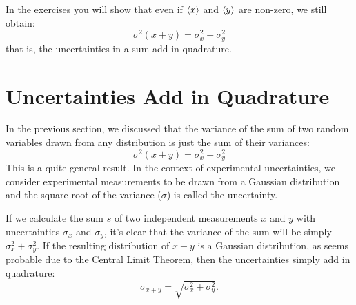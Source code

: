 \documentclass[12pt,oneside]{book}
\begin{document}
In the exercises you will show that even if $\braket{x}$ and $\braket{y}$ are non-zero, we still obtain:
\begin{displaymath}
\sigma^2(x+y) = \sigma^2_x + \sigma^2_y
\end{displaymath}
that is, the uncertainties in a sum add in quadrature.

\section{Uncertainties Add in Quadrature}

In the previous section, we discussed that the variance of the sum of two random variables drawn from any distribution is just the sum of their variances:
\begin{displaymath}
\sigma^2(x+y) = \sigma^2_x + \sigma^2_y
\end{displaymath}
This is a quite general result.  In the context of experimental uncertainties, we consider experimental measurements to be drawn from a Gaussian distribution and the square-root of the variance ($\sigma$) is called the uncertainty.

If we calculate the sum $s$ of two independent measurements $x$ and $y$ with uncertainties $\sigma_x$ and $\sigma_y$, it's clear that the variance of the sum will be simply $\sigma^2_x + \sigma^2_y$.  If the resulting distribution of $x+y$ is a Gaussian distribution, as seems probable due to the Central Limit Theorem, then the uncertainties simply add in quadrature:
\begin{displaymath}
\sigma_{x+y} = \sqrt{\sigma^2_x + \sigma^2_y}.
\end{displaymath}
\end{document}
